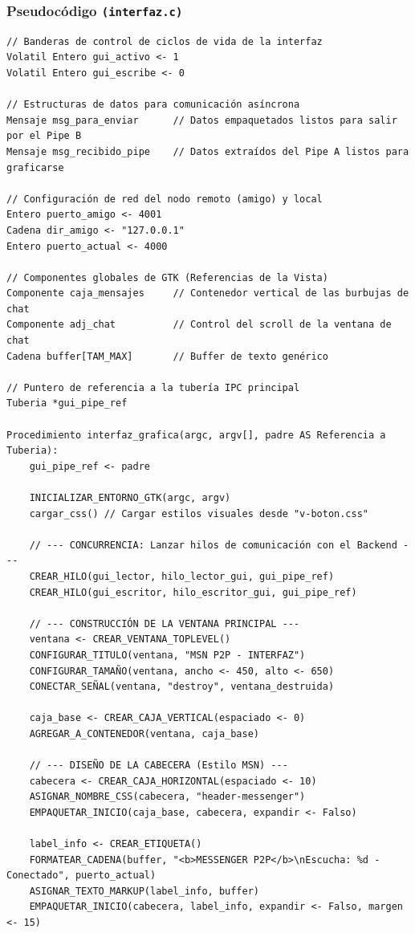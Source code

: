 \subsubsection{\large Pseudocódigo \texttt{(interfaz.c)}}
\begin{lstlisting}[style=estiloPseudo]
// Banderas de control de ciclos de vida de la interfaz
Volatil Entero gui_activo <- 1
Volatil Entero gui_escribe <- 0

// Estructuras de datos para comunicación asíncrona
Mensaje msg_para_enviar      // Datos empaquetados listos para salir por el Pipe B
Mensaje msg_recibido_pipe    // Datos extraídos del Pipe A listos para graficarse

// Configuración de red del nodo remoto (amigo) y local
Entero puerto_amigo <- 4001
Cadena dir_amigo <- "127.0.0.1"
Entero puerto_actual <- 4000

// Componentes globales de GTK (Referencias de la Vista)
Componente caja_mensajes     // Contenedor vertical de las burbujas de chat
Componente adj_chat          // Control del scroll de la ventana de chat
Cadena buffer[TAM_MAX]       // Buffer de texto genérico

// Puntero de referencia a la tubería IPC principal
Tuberia *gui_pipe_ref

Procedimiento interfaz_grafica(argc, argv[], padre AS Referencia a Tuberia):
    gui_pipe_ref <- padre

    INICIALIZAR_ENTORNO_GTK(argc, argv)
    cargar_css() // Cargar estilos visuales desde "v-boton.css"

    // --- CONCURRENCIA: Lanzar hilos de comunicación con el Backend ---
    CREAR_HILO(gui_lector, hilo_lector_gui, gui_pipe_ref)
    CREAR_HILO(gui_escritor, hilo_escritor_gui, gui_pipe_ref)

    // --- CONSTRUCCIÓN DE LA VENTANA PRINCIPAL ---
    ventana <- CREAR_VENTANA_TOPLEVEL()
    CONFIGURAR_TITULO(ventana, "MSN P2P - INTERFAZ")
    CONFIGURAR_TAMAÑO(ventana, ancho <- 450, alto <- 650)
    CONECTAR_SEÑAL(ventana, "destroy", ventana_destruida)

    caja_base <- CREAR_CAJA_VERTICAL(espaciado <- 0)
    AGREGAR_A_CONTENEDOR(ventana, caja_base)

    // --- DISEÑO DE LA CABECERA (Estilo MSN) ---
    cabecera <- CREAR_CAJA_HORIZONTAL(espaciado <- 10)
    ASIGNAR_NOMBRE_CSS(cabecera, "header-messenger")
    EMPAQUETAR_INICIO(caja_base, cabecera, expandir <- Falso)
    
    label_info <- CREAR_ETIQUETA()
    FORMATEAR_CADENA(buffer, "<b>MESSENGER P2P</b>\nEscucha: %d - Conectado", puerto_actual)
    ASIGNAR_TEXTO_MARKUP(label_info, buffer)
    EMPAQUETAR_INICIO(cabecera, label_info, expandir <- Falso, margen <- 15)


\end{lstlisting}
